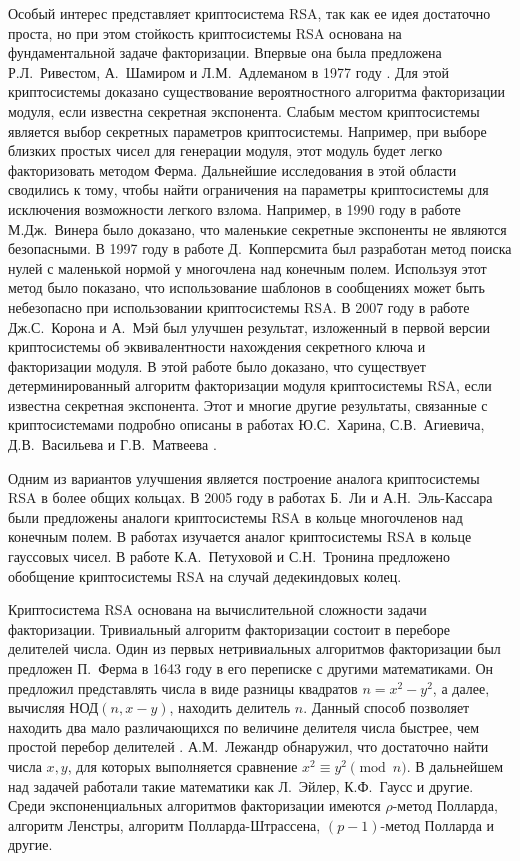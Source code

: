 \documentclass[_00_dissertation.tex]{subfiles}
\begin{document}
Особый интерес представляет криптосистема RSA, так как ее идея достаточно проста, но при этом стойкость криптосистемы RSA основана на фундаментальной задаче факторизации.
Впервые она была предложена Р.Л.~Ривестом, А.~Шамиром и Л.М.~Адлеманом в 1977 году \cite{source:Rivest}.
Для этой криптосистемы доказано существование вероятностного алгоритма факторизации модуля, если известна секретная экспонента.
Слабым местом криптосистемы является выбор секретных параметров криптосистемы.
Например, при выборе близких простых чисел для генерации модуля, этот модуль будет легко факторизовать методом Ферма.
Дальнейшие исследования в этой области сводились к тому, чтобы найти ограничения на параметры криптосистемы для исключения возможности легкого взлома.
Например, в 1990 году в работе М.Дж.~Винера \cite{source:Wiener} было доказано, что маленькие секретные экспоненты не являются безопасными.
В 1997 году в работе Д.~Копперсмита \cite{source:Coppersmith} был разработан метод поиска нулей с маленькой нормой у многочлена над конечным полем.
Используя этот метод было показано, что использование шаблонов в сообщениях может быть небезопасно при использовании криптосистемы RSA.
В 2007 году в работе Дж.С.~Корона и А.~Мэй \cite{source:Coron} был улучшен результат, изложенный в первой версии криптосистемы об эквивалентности нахождения секретного ключа и факторизации модуля.
В этой работе было доказано, что существует детерминированный алгоритм факторизации модуля криптосистемы RSA, если известна секретная экспонента.
Этот и многие другие результаты, связанные с криптосистемами подробно описаны в работах Ю.С.~Харина, С.В.~Агиевича, Д.В.~Васильева и Г.В.~Матвеева \cite{source:Matveev_2019, source:Matveev_2018, source:Kharin}.

Одним из вариантов улучшения является построение аналога криптосистемы RSA в более общих кольцах.
В 2005 году в работах Б.~Ли и А.Н.~Эль-Кассара \cite{source:El_Kassar, source:Li} были предложены аналоги криптосистемы RSA в кольце многочленов над конечным полем.
В работах \cite{source:El_Kassar, source:Elkamchouchi, source:Koval} изучается аналог криптосистемы RSA в кольце гауссовых чисел.
В работе К.А.~Петуховой и С.Н.~Тронина \cite{source:Petukhova} предложено обобщение криптосистемы RSA на случай дедекиндовых колец.

Криптосистема RSA основана на вычислительной сложности задачи факторизации.
Тривиальный алгоритм факторизации состоит в переборе делителей числа.
Один из первых нетривиальных алгоритмов факторизации был предложен П.~Ферма в 1643 году в его переписке с другими математиками.
Он предложил представлять числа в виде разницы квадратов $n = x^2 - y^2$, а далее, вычисляя $\textrm{НОД}(n,x-y)$, находить делитель $n$.
Данный способ позволяет находить два мало различающихся по величине делителя числа быстрее, чем простой перебор делителей \cite{source:Yaschenko}.
А.М.~Лежандр обнаружил, что достаточно найти числа $x, y$, для которых выполняется сравнение $x^{2}\equiv y^{2}\pmod{n}$.
В дальнейшем над задачей работали такие математики как Л.~Эйлер, К.Ф.~Гаусс и другие.
Среди экспоненциальных алгоритмов факторизации имеются $\rho$-метод Полларда, алгоритм Ленстры, алгоритм Полларда-Штрассена, $(p-1)$-метод Полларда и другие.
\end{document}
